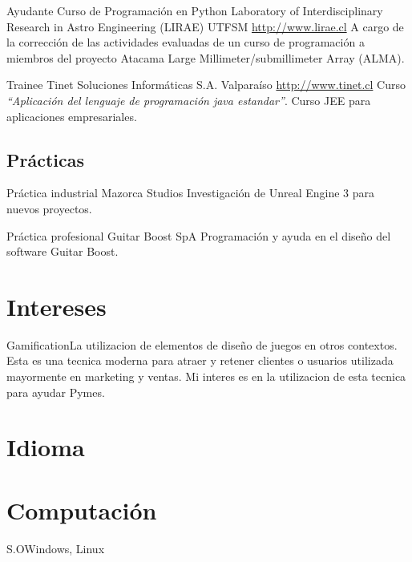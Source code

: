 \documentclass[letter,10pt]{moderncv}
\begin{document}
        {Ayudante Curso de Programación en Python}
        {Laboratory of Interdisciplinary Research in Astro Engineering (LIRAE)}
        {UTFSM}
        {\url{http://www.lirae.cl}}
        {A cargo de la corrección de las actividades evaluadas de un curso
        de programación a miembros del proyecto Atacama Large Millimeter/submillimeter
        Array (ALMA).}

        {Trainee}
        {Tinet Soluciones Informáticas S.A.}
        {Valparaíso}
        {\url{http://www.tinet.cl}}
        {Curso \emph{``Aplicación del lenguaje de programación java estandar''}. Curso JEE para aplicaciones
	empresariales.}

\subsection{Prácticas}

        {Práctica industrial}
        {Mazorca Studios}
        {}
        {}
        {Investigación de Unreal Engine 3 para nuevos proyectos.}%

        {Práctica profesional}
        {Guitar Boost SpA}
        {}
        {}
        {Programación y ayuda en el diseño del software Guitar Boost.}%

\section{Intereses}
           {Gamification}{La utilizacion de elementos de diseño de juegos en otros 
	   contextos. Esta es una tecnica moderna para atraer y retener clientes 
           o usuarios utilizada mayormente en marketing y ventas. Mi interes es en
           la utilizacion de esta tecnica para ayudar Pymes.}

\section{Idioma}

\section{Computaci\'on}
 {S.O}{Windows, Linux}
\end{document}
